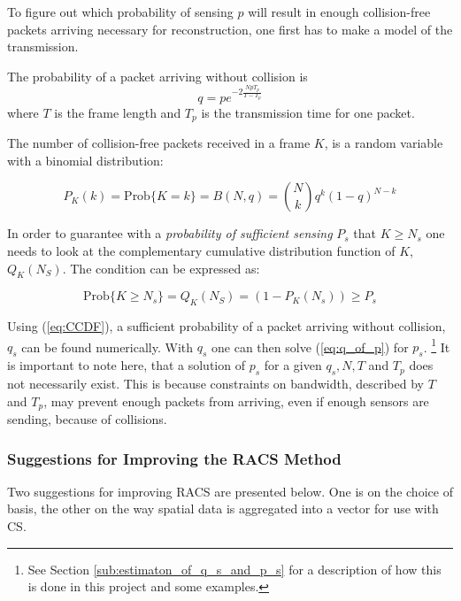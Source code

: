 \documentclass[Main]{subfiles}
\begin{document}
			To figure out which probability of sensing $p$ will result in enough collision-free packets arriving necessary for reconstruction, one first has to make a model of the transmission.

			The probability of a packet arriving without collision is
			\begin{equation}
				q = pe^{-2\frac{NpT_p}{T-T_p}}
				\label{eq:q_of_p} 
			\end{equation}
			where $T$ is the frame length and $T_p$ is the transmission time for one packet.

			\newpage
			The number of collision-free packets received in a frame $K$, is a random variable with a binomial distribution:

			\begin{equation}
				P_K(k) = \text{Prob}\{K=k\} = B(N,q) =
					\binom{N}{k} q^k(1-q)^{N-k}
					\label{eq:BinomialModel}
			\end{equation}
			
			In order to guarantee with a \emph{probability of sufficient sensing} $P_s$ that $K \geq N_s$ one needs to look at the complementary cumulative distribution function of $K$, $Q_K(N_S)$.
			The condition can be expressed as:

			\begin{equation}
				\text{Prob}\{K \geq N_s\} = Q_K(N_S) = (1-P_K(N_s)) \geq P_s
				\label{eq:CCDF} 
			\end{equation}
			
			Using (\ref{eq:CCDF}), a sufficient probability of a packet arriving without collision, $q_s$ can be found numerically.
			With $q_s$ one can then solve (\ref{eq:q_of_p}) for $p_s$.
			\footnote{See Section \ref{sub:estimaton_of_q_s_and_p_s} for a description of how this is done in this project and some examples.}
			It is important to note here, that a solution of $p_s$ for a given $q_s, N, T$ and $T_p$ does not necessarily exist.
			This is because constraints on bandwidth, described by $T$ and $T_p$, may prevent enough packets from arriving, even if enough sensors are sending, because of collisions.

		\newpage
		\subsubsection{Suggestions for Improving the RACS Method} %
		\label{sub:suggestions_for_improving_the_racs_method}

			Two suggestions for improving RACS are presented below.
			One is on the choice of basis, the other on the way spatial data is aggregated into a vector for use with CS.
\end{document}
